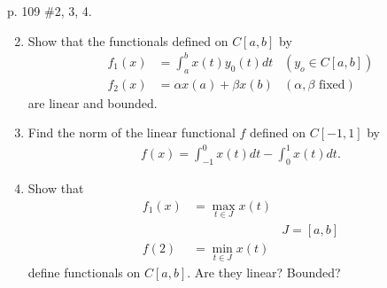 \documentclass[10pt,a4paper]{report}
\begin{document}
p. 109 \#2, 3, 4.
\begin{enumerate}
	\setcounter{enumi}{1}
	\item Show that the functionals defined on $C[a,b]$ by 
	\begin{align*}
		f_1(x) &= \int_a^b x(t)y_0(t)dt & (y_o\in C[a,b]) \\
		f_2(x) &= \alpha x(a) + \beta x(b) & (\alpha, \beta \text{ fixed})
	\end{align*}are linear and bounded.
	\item Find the norm of the linear functional $f$ defined on $C[-1,1]$ by 
	\begin{align*}
		f(x) = \int_{-1}^0 x(t)dt-\int_0^1 x(t) dt.
	\end{align*}
	\item Show that
	\begin{align*}
		f_1(x) &= \max_{t\in J} x(t) \\
		 & & J=[a,b]\\
		 f(2) &= \min_{t \in J} x(t)
	\end{align*}define functionals on $C[a,b]$.  Are they linear? Bounded?
\end{enumerate}
\end{document}
